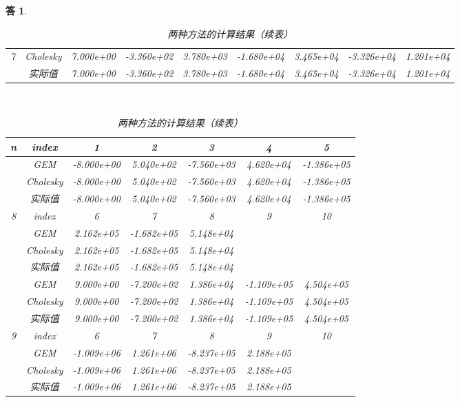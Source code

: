 \documentclass[10pt]{ctexart}
\newtheorem*{answer}{答}
\begin{document}
\begin{answer}
\begin{table}[H]
\begin{tabular}{ccccccccc}
            7 & Cholesky & 7.000e+00 & -3.360e+02 & 3.780e+03 & -1.680e+04 & 3.465e+04 & -3.326e+04 & 1.201e+04\\
             & 实际值 & 7.000e+00 & -3.360e+02 & 3.780e+03 & -1.680e+04 & 3.465e+04 & -3.326e+04 & 1.201e+04\\
            \bottomrule
        \end{tabular}
        \caption{两种方法的计算结果}
        \ \\
        \begin{tabular}{ccccccc}
            \toprule
            n & index & 1 & 2 & 3 & 4 & 5\\
            \midrule
            & GEM & -8.000e+00 & 5.040e+02 & -7.560e+03 & 4.620e+04 & -1.386e+05\\
             & Cholesky & -8.000e+00 & 5.040e+02 & -7.560e+03 & 4.620e+04 & -1.386e+05\\
             & 实际值 & -8.000e+00 & 5.040e+02 & -7.560e+03 & 4.620e+04 & -1.386e+05\\
            \cmidrule{2-7}
            8 & index & 6 & 7 & 8 & 9 & 10\\
            \cmidrule{2-7}
            & GEM & 2.162e+05 & -1.682e+05 & 5.148e+04\\
             & Cholesky & 2.162e+05 & -1.682e+05 & 5.148e+04\\
             & 实际值 & 2.162e+05 & -1.682e+05 & 5.148e+04\\
            \midrule
            & GEM & 9.000e+00 & -7.200e+02 & 1.386e+04 & -1.109e+05 & 4.504e+05\\
             & Cholesky & 9.000e+00 & -7.200e+02 & 1.386e+04 & -1.109e+05 & 4.504e+05\\
             & 实际值 & 9.000e+00 & -7.200e+02 & 1.386e+04 & -1.109e+05 & 4.504e+05\\
            \cmidrule{2-7}
            9 & index & 6 & 7 & 8 & 9 & 10\\
            \cmidrule{2-7}
            & GEM & -1.009e+06 & 1.261e+06 & -8.237e+05 & 2.188e+05\\
             & Cholesky & -1.009e+06 & 1.261e+06 & -8.237e+05 & 2.188e+05\\
             & 实际值 & -1.009e+06 & 1.261e+06 & -8.237e+05 & 2.188e+05\\
            \bottomrule
        \end{tabular}
        \caption{两种方法的计算结果（续表）}
    \end{table}
    \begin{table}[H]

\end{table}
\end{answer}
\end{document}
